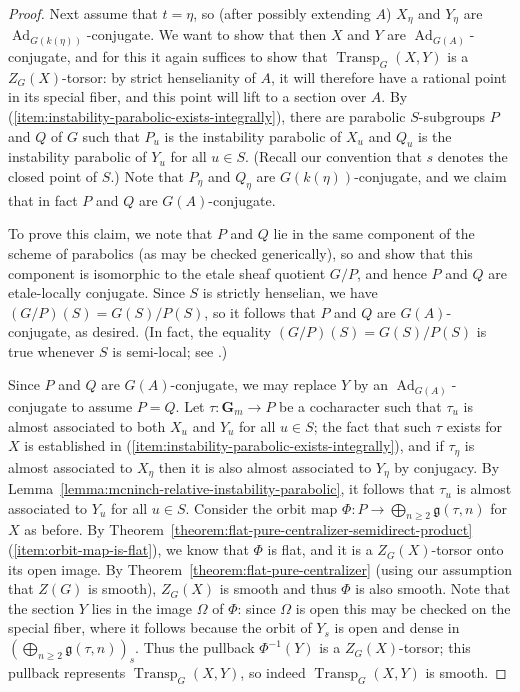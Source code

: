 \documentclass[11pt,reqno]{amsart}
\theoremstyle{definition}
\newcommand{\bG}{{\mathbf G}}
\newcommand{\fg}{\mathfrak{g}}
\DeclareMathOperator{\Ad}{Ad}
\DeclareMathOperator{\Transp}{Transp}
\begin{document}
\begin{proof}
Next assume that $t = \eta$, so (after possibly extending $A$) $X_\eta$ and $Y_\eta$ are $\Ad_{G(k(\eta))}$-conjugate. We want to show that then $X$ and $Y$ are $\Ad_{G(A)}$-conjugate, and for this it again suffices to show that $\Transp_G(X, Y)$ is a $Z_G(X)$-torsor: by strict henselianity of $A$, it will therefore have a rational point in its special fiber, and this point will lift to a section over $A$. By (\ref{item:instability-parabolic-exists-integrally}), there are parabolic $S$-subgroups $P$ and $Q$ of $G$ such that $P_u$ is the instability parabolic of $X_u$ and $Q_u$ is the instability parabolic of $Y_u$ for all $u \in S$. (Recall our convention that $s$ denotes the closed point of $S$.) Note that $P_\eta$ and $Q_\eta$ are $G(k(\eta))$-conjugate, and we claim that in fact $P$ and $Q$ are $G(A)$-conjugate. \smallskip

To prove this claim, we note that $P$ and $Q$ lie in the same component of the scheme of parabolics (as may be checked generically), so \cite[Exp.\ XXVI, Thm.\ 3.3]{SGA3} and \cite[Cor.\ 5.2.8]{Conrad} show that this component is isomorphic to the etale sheaf quotient $G/P$, and hence $P$ and $Q$ are etale-locally conjugate. Since $S$ is strictly henselian, we have $(G/P)(S) = G(S)/P(S)$, so it follows that $P$ and $Q$ are $G(A)$-conjugate, as desired. (In fact, the equality $(G/P)(S) = G(S)/P(S)$ is true whenever $S$ is semi-local; see \cite[Exp.\ XXVI, Cor.\ 5.2]{SGA3}.) \smallskip

Since $P$ and $Q$ are $G(A)$-conjugate, we may replace $Y$ by an $\Ad_{G(A)}$-conjugate to assume $P = Q$. Let $\tau: \bG_m \to P$ be a cocharacter such that $\tau_u$ is almost associated to both $X_u$ and $Y_u$ for all $u \in S$; the fact that such $\tau$ exists for $X$ is established in (\ref{item:instability-parabolic-exists-integrally}), and if $\tau_\eta$ is almost associated to $X_\eta$ then it is also almost associated to $Y_\eta$ by conjugacy. By Lemma~\ref{lemma:mcninch-relative-instability-parabolic}, it follows that $\tau_u$ is almost associated to $Y_u$ for all $u \in S$. Consider the orbit map $\Phi: P \to \bigoplus_{n \geq 2} \fg(\tau, n)$ for $X$ as before. By Theorem~\ref{theorem:flat-pure-centralizer-semidirect-product}(\ref{item:orbit-map-is-flat}), we know that $\Phi$ is flat, and it is a $Z_G(X)$-torsor onto its open image. By Theorem~\ref{theorem:flat-pure-centralizer} (using our assumption that $Z(G)$ is smooth), $Z_G(X)$ is smooth and thus $\Phi$ is also smooth. Note that the section $Y$ lies in the image $\Omega$ of $\Phi$: since $\Omega$ is open this may be checked on the special fiber, where it follows because the orbit of $Y_s$ is open and dense in $(\bigoplus_{n \geq 2} \fg(\tau, n))_s$. Thus the pullback $\Phi^{-1}(Y)$ is a $Z_G(X)$-torsor; this pullback represents $\Transp_G(X, Y)$, so indeed $\Transp_G(X, Y)$ is smooth.
\end{proof}
\end{document}
